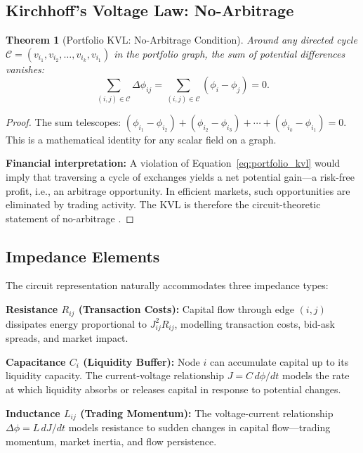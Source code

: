 \documentclass[twocolumn,10pt]{article}
\newtheorem{theorem}{Theorem}[section]
\theoremstyle{remark}
\newcommand{\eqnref}[1]{Equation~\ref{#1}}
\begin{document}
\subsection{Kirchhoff's Voltage Law: No-Arbitrage}

\begin{theorem}[Portfolio KVL: No-Arbitrage Condition]
\label{thm:portfolio_kvl}
Around any directed cycle $\mathcal{C} = (v_{i_1}, v_{i_2}, \ldots, v_{i_k}, v_{i_1})$ in the portfolio graph, the sum of potential differences vanishes:
\begin{equation}
    \sum_{(i,j) \in \mathcal{C}} \Delta\phi_{ij} = \sum_{(i,j) \in \mathcal{C}} (\phi_i - \phi_j) = 0.
    \label{eq:portfolio_kvl}
\end{equation}
\end{theorem}

\begin{proof}
The sum telescopes: $(\phi_{i_1} - \phi_{i_2}) + (\phi_{i_2} - \phi_{i_3}) + \cdots + (\phi_{i_k} - \phi_{i_1}) = 0$.  This is a mathematical identity for any scalar field on a graph.

\textbf{Financial interpretation:}  A violation of \eqnref{eq:portfolio_kvl} would imply that traversing a cycle of exchanges yields a net potential gain---a risk-free profit, i.e., an arbitrage opportunity.  In efficient markets, such opportunities are eliminated by trading activity.  The KVL is therefore the circuit-theoretic statement of no-arbitrage \cite{ross1976}.
\end{proof}

\subsection{Impedance Elements}

The circuit representation naturally accommodates three impedance types:

\textbf{Resistance $R_{ij}$ (Transaction Costs):}  Capital flow through edge $(i,j)$ dissipates energy proportional to $J_{ij}^2 R_{ij}$, modelling transaction costs, bid-ask spreads, and market impact.

\textbf{Capacitance $C_i$ (Liquidity Buffer):}  Node $i$ can accumulate capital up to its liquidity capacity.  The current-voltage relationship $J = C \, d\phi/dt$ models the rate at which liquidity absorbs or releases capital in response to potential changes.

\textbf{Inductance $L_{ij}$ (Trading Momentum):}  The voltage-current relationship $\Delta\phi = L \, dJ/dt$ models resistance to sudden changes in capital flow---trading momentum, market inertia, and flow persistence.
\end{document}
